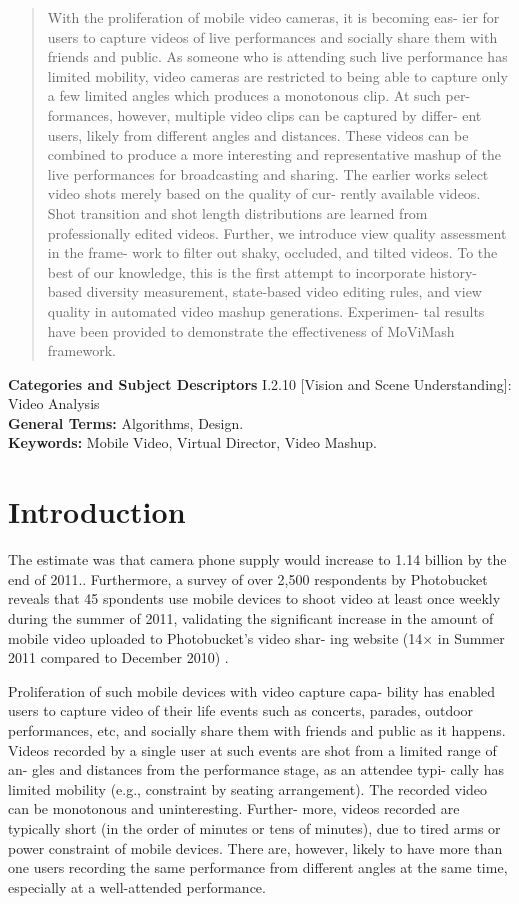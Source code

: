 \documentclass[conference]{IEEEtran}
\begin{document}
\maketitle
\begin{abstract}
With the proliferation of mobile video cameras, it is becoming eas-
ier for users to capture videos of live performances and socially
share them with friends and public. As someone who is attending such live performance has limited mobility, video cameras are restricted to being able to capture only a few limited angles which produces a monotonous clip. At such per-
formances, however, multiple video clips can be captured by differ-
ent users, likely from different angles and distances. These videos
can be combined to produce a more interesting and representative
mashup of the live performances for broadcasting and sharing. The
earlier works select video shots merely based on the quality of cur-
rently available videos. Shot transition
and shot length distributions are learned from professionally edited
videos. Further, we introduce view quality assessment in the frame-
work to filter out shaky, occluded, and tilted videos. To the best
of our knowledge, this is the first attempt to incorporate history-
based diversity measurement, state-based video editing rules, and
view quality in automated video mashup generations. Experimen-
tal results have been provided to demonstrate the effectiveness of
MoViMash framework.
\end{abstract}
\textbf{Categories and Subject Descriptors}
I.2.10 [Vision and Scene Understanding]: Video Analysis\\
\textbf{General Terms:} Algorithms, Design.\\
\textbf{Keywords: }Mobile Video, Virtual Director, Video Mashup.
\section{Introduction}
The estimate was that camera phone supply would increase to 1.14 billion by the end of 2011.\cite{1}. Furthermore, a survey of
over 2,500 respondents by Photobucket reveals that 45%
spondents use mobile devices to shoot video at least once weekly during the summer of 2011, validating the significant increase in
the amount of mobile video uploaded to Photobucket’s video shar-
ing website (14× in Summer 2011 compared to December 2010) \cite{2}.

Proliferation of such mobile devices with video capture capa-
bility has enabled users to capture video of their life events such
as concerts, parades, outdoor performances, etc, and socially share
them with friends and public as it happens. Videos recorded by
a single user at such events are shot from a limited range of an-
gles and distances from the performance stage, as an attendee typi-
cally has limited mobility (e.g., constraint by seating arrangement).
The recorded video can be monotonous and uninteresting. Further-
more, videos recorded are typically short (in the order of minutes
or tens of minutes), due to tired arms or power constraint of mobile
devices. There are, however, likely to have more than one users
recording the same performance from different angles at the same
time, especially at a well-attended performance.
\end{document}
